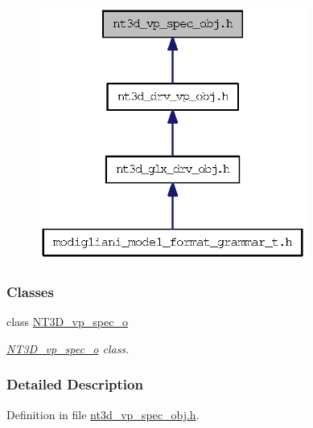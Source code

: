 \begin{figure}[H]
\begin{center}
\leavevmode
\includegraphics[width=250pt]{nt3d__vp__spec__obj_8h__dep__incl}
\end{center}
\end{figure}
\subsubsection*{Classes}
\begin{DoxyCompactItemize}
\item 
class \hyperlink{class_n_t3_d__vp__spec__o}{NT3D\_\-vp\_\-spec\_\-o}
\begin{DoxyCompactList}\small\item\em \hyperlink{class_n_t3_d__vp__spec__o}{NT3D\_\-vp\_\-spec\_\-o} class. \item\end{DoxyCompactList}\end{DoxyCompactItemize}


\subsubsection{Detailed Description}


Definition in file \hyperlink{nt3d__vp__spec__obj_8h_source}{nt3d\_\-vp\_\-spec\_\-obj.h}.

